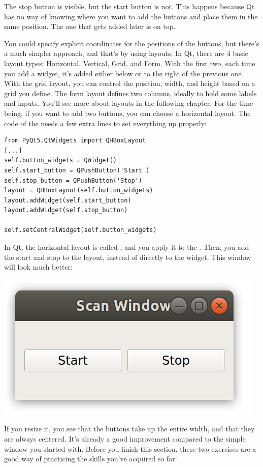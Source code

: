 The stop button is visible, but the start button is not. This happens because Qt has no way of knowing where you want to add the buttons and place them in the same position. The one that gets added later is on top.


You could specify explicit coordinates for the positions of the buttons, but there's a much simpler approach, and that's by using layouts. In Qt, there are 4 basic layout types: Horizontal, Vertical, Grid, and Form. With the first two, each time you add a widget, it's added either below or to the right of the previous one. With the grid layout, you can control the position, width, and height based on a grid you define. The form layout defines two columns, ideally to hold some labels and inputs. You'll see more about layouts in the following chapter. For the time being, if you want to add two buttons, you can choose a horizontal layout. The code of the  needs a few extra lines to set everything up properly:

\begin{verbatim}
from PyQt5.QtWidgets import QHBoxLayout
[...]
self.button_widgets = QWidget()
self.start_button = QPushButton('Start')
self.stop_button = QPushButton('Stop')
layout = QHBoxLayout(self.button_widgets)
layout.addWidget(self.start_button)
layout.addWidget(self.stop_button)

self.setCentralWidget(self.button_widgets)
\end{verbatim}

In Qt, the horizontal layout is called , and you apply it to the . Then, you add the start and stop to the layout, instead of directly to the widget. This window will look much better:

\begin{center}
    \includegraphics[width=.3\textwidth]{images/Chapter_08/06_window_with_layout.png}
\end{center}

If you resize it, you see that the buttons take up the entire width, and that they are always centered. It's already a good improvement compared to the simple window you started with. Before you finish this section, these two exercises are a good way of practicing the skills you've acquired so far:

